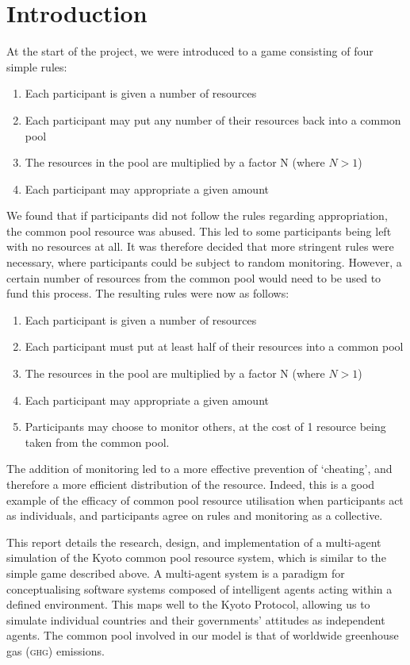 \section{Introduction}

At the start of the project, we were introduced to a game consisting of four simple rules:

\begin{enumerate}
\item Each participant is given a number of resources
\item Each participant may put any number of their resources back into a common pool
\item	The resources in the pool are multiplied by a factor N (where $N > 1$)
\item	Each participant may appropriate a given amount
\end{enumerate}

We found that if participants did not follow the rules regarding appropriation, the common pool resource was abused. This led to some participants being left with no resources at all. It was therefore decided that more stringent rules were necessary, where participants could be subject to random monitoring. However, a certain number of resources from the common pool would need to be used to fund this process. The resulting rules were now as follows:

\begin{enumerate}
	\item Each participant is given a number of resources
	\item Each participant must put at least half of their resources into a common pool
	\item The resources in the pool are multiplied by a factor N (where $N > 1$)
	\item Each participant may appropriate a given amount
	\item Participants may choose to monitor others, at the cost of 1 resource being taken from the common pool.
\end{enumerate}

The addition of monitoring led to a more effective prevention of `cheating', and therefore a more efficient distribution of the resource. Indeed, this is a good example of the efficacy of common pool resource utilisation when participants act as individuals, and participants agree on rules and monitoring as a collective.

This report details the research, design, and implementation of a multi-agent simulation of the Kyoto common pool resource system, which is similar to the simple game described above. A multi-agent system is a paradigm for conceptualising software systems composed of intelligent agents acting within a defined environment. This maps well to the Kyoto Protocol, allowing us to simulate individual countries and their governments' attitudes as independent agents. The common pool involved in our model is that of worldwide greenhouse gas (\textsc{ghg}) emissions.

